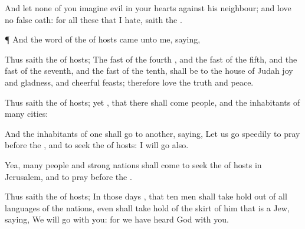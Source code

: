 {And let
none of you
imagine
evil in your
hearts against his
neighbour; and
love no
false
oath: for all these
{} that I
hate,
saith the
{}.


\par }{\PP {}¶ And the
word of the
{} of
hosts came unto me,
saying,

Thus
saith the
{} of
hosts; The
fast of the
fourth
{}, and the
fast of the
fifth, and the
fast of the
seventh, and the
fast of the
tenth, shall be to the
house of
Judah
joy and
gladness, and
cheerful
feasts; therefore
love the
truth and
peace.

Thus
saith the
{} of
hosts;
{} yet
{}, that there shall
come
people, and the
inhabitants of
many
cities:

And the
inhabitants of
one
{} shall
go to
another,
saying, Let us
go
speedily to
pray
before the
{}, and to
seek the
{} of
hosts: I will
go also.

Yea,
many
people and
strong
nations shall
come to
seek the
{} of
hosts in
Jerusalem, and to
pray
before the
{}.

Thus
saith the
{} of
hosts; In those
days
{}, that
ten
men shall take
hold out of all
languages of the
nations, even shall take
hold of the
skirt of him that is a
Jew,
saying, We will
go with you: for we have
heard
{}
God
{} with you.




\par }
